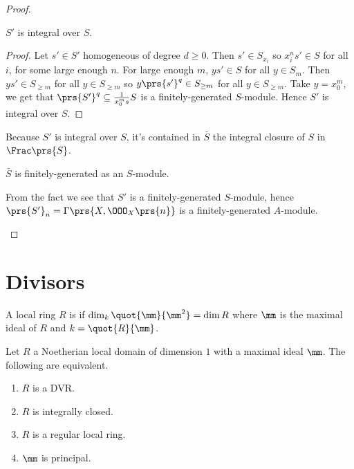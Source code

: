 \documentclass[10pt,a4paper,twoside,openany,hidelinks]{book}
\begin{document}
\begin{proof}
\begin{itemize}
\begin{claim}
$S'$ is integral over $S$.
\end{claim}

\begin{proof}
Let $s' \in S'$ homogeneous of degree $d \geq 0$. Then $s' \in S_{x_i}$ so $x_i^n s' \in S$ for all $i$, for some large enough $n$.
For large enough $m$, $ys' \in S$ for all $y \in S_m$.
Then $y s' \in S_{\geq m}$ for all $y \in S_{\geq m}$ so $y \prs{s'}^q \in S_{\geq m}$ for all $y \in S_{\geq m}$. Take $y = x_0^m$, we get that $\prs{S'}^q \subseteq \frac{1}{x_0^m s} S$ is a finitely-generated $S$-module. Hence $S'$ is integral over $S$.
\end{proof}

Because $S'$ is integral over $S$, it's contained in $\bar{S}$ the integral closure of $S$ in $\Frac\prs{S}$.

\begin{fact}
$\bar{S}$ is finitely-generated as an $S$-module.
\end{fact}
From the fact we see that $S'$ is a finitely-generated $S$-module, hence $\prs{S'}_n = \Gamma\prs{X, \OOO_X\prs{n}}$ is a finitely-generated $A$-module.
\end{itemize}
\end{proof}

\chapter{Divisors}

\begin{definition}
A local ring $R$ is  if $\dim_k \quot{\mm}{\mm^2} = \dim R$ where $\mm$ is the maximal ideal of $R$ and $k = \quot{R}{\mm}$.
\end{definition}

\begin{theorem}[A-M, 9.2]
Let $R$ a Noetherian local domain of dimension $1$ with a maximal ideal $\mm$.
The following are equivalent.

\begin{enumerate}
\item $R$ is a DVR.
\item $R$ is integrally closed.
\item $R$ is a regular local ring.
\item $\mm$ is principal.
\end{enumerate}
\end{theorem}
\end{document}
